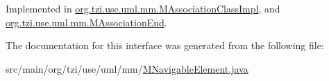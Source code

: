 Implemented in \hyperlink{classorg_1_1tzi_1_1use_1_1uml_1_1mm_1_1_m_association_class_impl_a3477c41144650a353e4527ff50792b3b}{org.\-tzi.\-use.\-uml.\-mm.\-M\-Association\-Class\-Impl}, and \hyperlink{classorg_1_1tzi_1_1use_1_1uml_1_1mm_1_1_m_association_end_aeb428fba80dade9b43d767212c912dfd}{org.\-tzi.\-use.\-uml.\-mm.\-M\-Association\-End}.



The documentation for this interface was generated from the following file\-:\begin{DoxyCompactItemize}
\item 
src/main/org/tzi/use/uml/mm/\hyperlink{_m_navigable_element_8java}{M\-Navigable\-Element.\-java}\end{DoxyCompactItemize}
